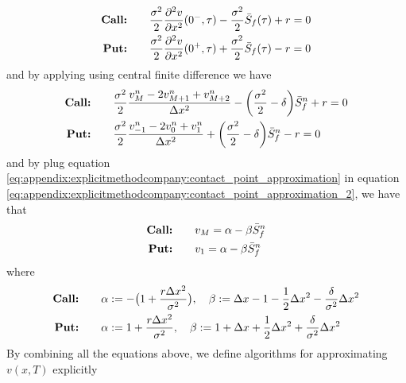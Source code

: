 \begin{align}
    \label{eq:appendix:explicitmethodcompany:contact_point_approximation}
    \text{\textbf{Call:}} \qquad & \dfrac{\sigma^2}{2}\dfrac{\partial^2{v}}{\partial{x^2}}(0^-, \tau) - \dfrac{\sigma^2}{2}\bar{S}_f(\tau) + r = 0 \\
    \text{\textbf{Put:}} \qquad & \dfrac{\sigma^2}{2}\dfrac{\partial^2{v}}{\partial{x^2}}(0^+, \tau) + \dfrac{\sigma^2}{2}\bar{S}_f(\tau) - r = 0
\end{align}
and by applying using central finite difference we have
\begin{align}
    \label{eq:appendix:explicitmethodcompany:contact_point_approximation_2}
    \text{\textbf{Call:}} \qquad & \dfrac{\sigma^2}{2}\dfrac{v^{n}_{M} - 2v^{n}_{M+1} + v^{n}_{M+2}}{\Delta{x}^2} - \bigg(\dfrac{\sigma^2}{2}-\delta\bigg)\bar{S}^n_f + r = 0 \\
    \text{\textbf{Put:}} \qquad & \dfrac{\sigma^2}{2}\dfrac{v^{n}_{-1} - 2v^{n}_{0} + v^{n}_{1}}{\Delta{x}^2} + \bigg(\dfrac{\sigma^2}{2}-\delta\bigg)\bar{S}^n_f -r = 0
\end{align}
and by plug equation \eqref{eq:appendix:explicitmethodcompany:contact_point_approximation} in equation \eqref{eq:appendix:explicitmethodcompany:contact_point_approximation_2}, we have that 
\begin{align}
    \text{\textbf{Call:}} \qquad & v_{M} = \alpha - \beta\bar{S}^n_f \\
    \text{\textbf{Put:}} \qquad & v_{1} = \alpha - \beta\bar{S}^n_f \\
\end{align}
where
\begin{align}
    \label{eq:appendix:explicitmethodcompany:alpha_beta}
    \text{\textbf{Call:}} \qquad & \alpha := -\big(1 + \dfrac{r\Delta{x}^2}{\sigma^2}\big), \quad \beta := \Delta{x}-1-\dfrac{1}{2}\Delta{x}^2-\dfrac{\delta}{\sigma^2}\Delta{x}^2\\
    \text{\textbf{Put:}} \qquad & \alpha := 1 + \dfrac{r\Delta{x}^2}{\sigma^2}, \quad \beta := 1+\Delta{x}+\dfrac{1}{2}\Delta{x}^2+\dfrac{\delta}{\sigma^2}\Delta{x}^2
\end{align}
By combining all the equations above, we define algorithms for approximating $v(x,T)$ explicitly
